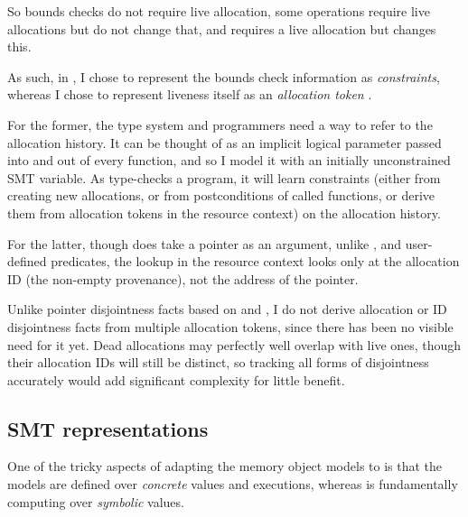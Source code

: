 So bounds checks do not require live allocation, some operations require
live allocations but do not change that, and  requires
a live allocation but changes this.

As such, in , I chose to represent the bounds check information as
\emph{constraints}, whereas I chose to represent liveness itself as an
\emph{allocation token} .

For the former, the type system and programmers need a way to refer to the
allocation history. It can be thought of as an implicit logical parameter
passed into and out of every function, and so I model it with an initially
unconstrained SMT variable. As  type-checks a  program, it
will learn constraints (either from creating new allocations, or from
postconditions of called functions, or derive them from allocation tokens in
the resource context) on the allocation history.

For the latter, though  does take a pointer as an argument,
unlike ,  and user-defined predicates, the
lookup in the resource context looks only at the allocation ID (the non-empty
provenance), not the address of the pointer.

Unlike pointer disjointness facts based on  and
, I do not derive allocation or ID disjointness facts from
multiple allocation tokens, since there has been no visible need for it
yet.\label{sn:ptr-eq-annotation} Dead allocations may perfectly well overlap
with live ones, though their allocation IDs will still be distinct, so tracking
all forms of disjointness accurately would add significant complexity for
little benefit.

\subsection{SMT representations}

One of the tricky aspects of adapting the memory object models to  is
that the models are defined over \emph{concrete} values and executions, whereas
 is fundamentally computing over \emph{symbolic} values.

